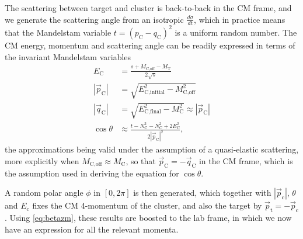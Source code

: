 The scattering between target and cluster is back-to-back in the CM frame, and we generate the scattering angle from an isotropic $\tfrac{d\sigma}{dt}$, which in practice means that the Mandelstam variable $t=(p_\text{C}-q_\text{C})^2$ is a uniform random number. The CM energy, momentum and scattering angle can be readily expressed in terms of the invariant Mandelstam variables%
\begin{align}
E_\text{C} &= \frac{s+M_\text{C,off} - M_\text{T}}{2\sqrt{s}} \\
|\vec{p}_\text{C}| &= \sqrt{E_\text{C,initial}^2 - M_\text{C,off}^2} \\
|\vec{q}_\text{C}| &= \sqrt{E_\text{C,final}^2 - M_\text{C}^2} \approx |\vec{p}_\text{C}|\\
\cos{\theta} &\approx \frac{t-N_\text{C}^2-N_\text{C}^2 + 2E_\text{C}^2}{2|\vec{p}_\text{C}|^2},
\end{align}
the approximations being valid under the assumption of a quasi-elastic scattering, more explicitly when $M_\text{C,off} \approx M_\text{C}$, so that $\vec{p}_\text{C} = -\vec{q}_\text{C}$ in the CM frame, which is the assumption used in deriving the equation for $\cos{\theta}$. %

A random polar angle $\phi$ in $[0,2\pi]$ is then generated, which together with $|\vec{p}_\text{c}|$, $\theta$ and $E_\text{c}$ fixes the CM 4-momentum of the cluster, and also the target by $\vec{p}_\text{t} = -\vec{p}_\text{c}$. Using \eqref{eq:betazm}, these results are boosted to the lab frame, in which we now have an expression for all the relevant momenta.

